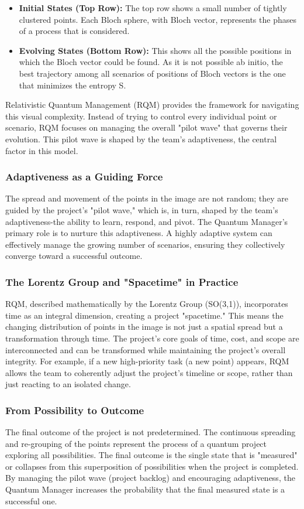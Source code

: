 \documentclass{article}
\begin{document}
\begin{itemize}
\item \textbf{Initial States (Top Row):} The top row shows a small number of tightly clustered points. Each Bloch sphere, with Bloch vector, represents the phases of a process that is considered.
\item \textbf{Evolving States (Bottom Row):} This shows all the possible positions in which the Bloch vector could be found. As it is not possible ab initio, the best trajectory among all scenarios of positions of Bloch vectors is the one that minimizes the entropy S.
\end{itemize}


Relativistic Quantum Management (RQM) provides the framework for navigating this visual complexity. Instead of trying to control every individual point or scenario, RQM focuses on managing the overall "pilot wave" that governs their evolution. This pilot wave is shaped by the team's adaptiveness, the central factor in this model.

\subsubsection*{Adaptiveness as a Guiding Force}
The spread and movement of the points in the image are not random; they are guided by the project's "pilot wave," which is, in turn, shaped by the team's adaptiveness-the ability to learn, respond, and pivot. The Quantum Manager's primary role is to nurture this adaptiveness. A highly adaptive system can effectively manage the growing number of scenarios, ensuring they collectively converge toward a successful outcome.

\subsubsection*{The Lorentz Group and "Spacetime" in Practice}
RQM, described mathematically by the Lorentz Group (SO(3,1)), incorporates time as an integral dimension, creating a project "spacetime." This means the changing distribution of points in the image is not just a spatial spread but a transformation through time. The project's core goals of time, cost, and scope are interconnected and can be transformed while maintaining the project's overall integrity. For example, if a new high-priority task (a new point) appears, RQM allows the team to coherently adjust the project's timeline or scope, rather than just reacting to an isolated change.

\subsubsection*{From Possibility to Outcome}
The final outcome of the project is not predetermined. The continuous spreading and re-grouping of the points represent the process of a quantum project exploring all possibilities. The final outcome is the single state that is "measured" or collapses from this superposition of possibilities when the project is completed. By managing the pilot wave (project backlog) and encouraging adaptiveness, the Quantum Manager increases the probability that the final measured state is a successful one.
\end{document}
